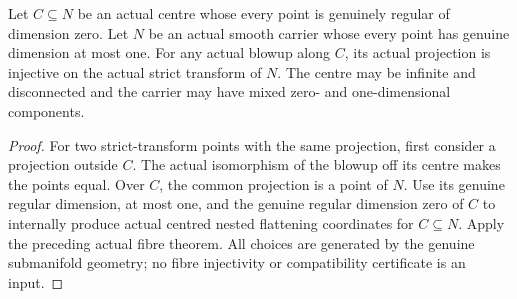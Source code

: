 \begin{theorem}
\label{hir:curve-strict-transform-projection-injective}
\leanok
Let $C\subseteq N$ be an actual centre whose every point is genuinely regular
of dimension zero. Let $N$ be an actual smooth carrier whose every
point has genuine dimension at most one. For any actual blowup along $C$,
its actual projection is injective on the actual strict transform of $N$.
The centre may be infinite and disconnected and the carrier may have mixed
zero- and one-dimensional components.
\end{theorem}
\begin{proof}
For two strict-transform points with the same projection, first consider a
projection outside $C$. The actual isomorphism of the blowup off its centre
makes the points equal. Over $C$, the common projection is a point of $N$.
Use its genuine regular dimension, at most one, and the genuine regular
dimension zero of $C$ to internally produce actual centred nested flattening
coordinates for $C\subseteq N$. Apply the preceding actual fibre theorem.
All choices are generated by the genuine submanifold geometry; no fibre
injectivity or compatibility certificate is an input.
\end{proof}

